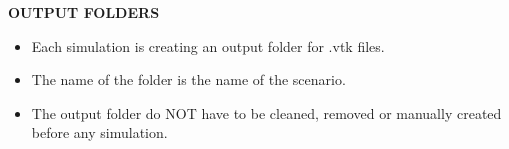 \documentclass[]{article}
\providecommand{\tightlist}{%
  \setlength{\itemsep}{0pt}\setlength{\parskip}{0pt}}
\begin{document}
\textbf{OUTPUT FOLDERS}

\begin{itemize}
\tightlist
\item
  Each simulation is creating an output folder for .vtk files.
\item
  The name of the folder is the name of the scenario.
\item
  The output folder do NOT have to be cleaned, removed or manually
  created before any simulation.
\end{itemize}
\end{document}
